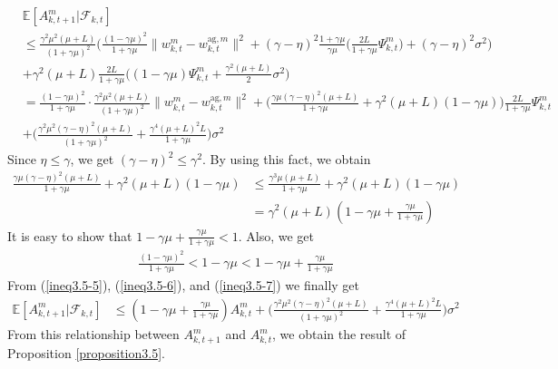 \documentclass[11pt]{article}
\begin{document}
\begin{align} \label{ineq3.5-5}
    &\mathbb{E}[A_{k, t+1}^m|\mathcal{F}_{k, t}] \nonumber\\
    &\leq \frac{\gamma^2\mu^2(\mu+L)}{(1+\gamma\mu)^2}\bigg(\frac{(1-\gamma\mu)^2}{1+\gamma\mu}\|w_{k, t}^m - w_{k, t}^{\textrm{ag}, m}\|^2 + (\gamma-\eta)^2\frac{1+\gamma\mu}{\gamma\mu}\Big(\frac{2L}{1+\gamma\mu}\Psi_{k, t}^m\Big) + (\gamma-\eta)^2\sigma^2\bigg) \nonumber\\
    &+ \gamma^2(\mu+L)\frac{2L}{1+\gamma\mu}\Big((1-\gamma\mu)\Psi_{k, t}^m+\frac{\gamma^2(\mu+L)}{2}\sigma^2\Big) \nonumber\\
    &= \frac{(1-\gamma\mu)^2}{1+\gamma\mu}\cdot\frac{\gamma^2\mu^2(\mu+L)}{(1+\gamma\mu)^2}\|w_{k, t}^m - w_{k, t}^{\textrm{ag}, m}\|^2 + \Big(\frac{\gamma\mu(\gamma-\eta)^2(\mu+L)}{1+\gamma\mu} +\gamma^2(\mu+L)(1-\gamma\mu)\Big)\frac{2L}{1+\gamma\mu}\Psi_{k, t}^m \nonumber\\
    &+ \Big(\frac{\gamma^2\mu^2(\gamma-\eta)^2(\mu+L)}{(1+\gamma\mu)^2} + \frac{\gamma^4(\mu+L)^2 L}{1+\gamma\mu}\Big)\sigma^2
\end{align}
Since $\eta \leq \gamma$, we get $(\gamma-\eta)^2 \leq \gamma^2$. By using this fact, we obtain
\begin{align} \label{ineq3.5-6}
    \frac{\gamma\mu(\gamma-\eta)^2(\mu+L)}{1+\gamma\mu} +\gamma^2(\mu+L)(1-\gamma\mu) &\leq \frac{\gamma^3\mu(\mu+L)}{1+\gamma\mu} +\gamma^2(\mu+L)(1-\gamma\mu) \nonumber\\
    &= \gamma^2(\mu+L)(1-\gamma\mu+\frac{\gamma\mu}{1+\gamma\mu})
\end{align}
It is easy to show that $1-\gamma\mu+\frac{\gamma\mu}{1+\gamma\mu}<1$. Also, we get
\begin{align} \label{ineq3.5-7}
    \frac{(1-\gamma\mu)^2}{1+\gamma\mu} < 1-\gamma\mu < 1-\gamma\mu+\frac{\gamma\mu}{1+\gamma\mu}
\end{align}
From (\ref{ineq3.5-5}), (\ref{ineq3.5-6}), and (\ref{ineq3.5-7}) we finally get
\begin{align*}
    \mathbb{E}[A_{k, t+1}^m|\mathcal{F}_{k, t}] &\leq (1-\gamma\mu+\frac{\gamma\mu}{1+\gamma\mu})A_{k, t}^m + \Big(\frac{\gamma^2\mu^2(\gamma-\eta)^2(\mu+L)}{(1+\gamma\mu)^2} + \frac{\gamma^4(\mu+L)^2 L}{1+\gamma\mu}\Big)\sigma^2
\end{align*}
From this relationship between $A_{k, t+1}^m$ and $A_{k, t}^m$, we obtain the result of Proposition \ref{proposition3.5}.
\end{document}
